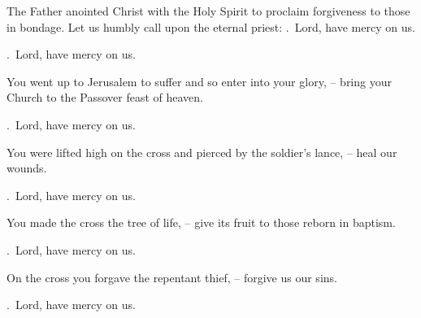 \lettrine[loversize=0.15,lines=2]{T}{}he Father anointed Christ with the Holy Spirit to proclaim forgiveness to those in bondage. Let us humbly call upon the eternal priest: \Rbar.~Lord, have mercy on us.
\par \Rbar.~Lord, have mercy on us.

You went up to Jerusalem to suffer and so enter into your glory,
– bring your Church to the Passover feast of heaven.
\par \Rbar.~Lord, have mercy on us.

You were lifted high on the cross and pierced by the soldier’s lance,
– heal our wounds.
\par \Rbar.~Lord, have mercy on us.

You made the cross the tree of life,
– give its fruit to those reborn in baptism.
\par \Rbar.~Lord, have mercy on us.

On the cross you forgave the repentant thief,
– forgive us our sins.
\par \Rbar.~Lord, have mercy on us.
